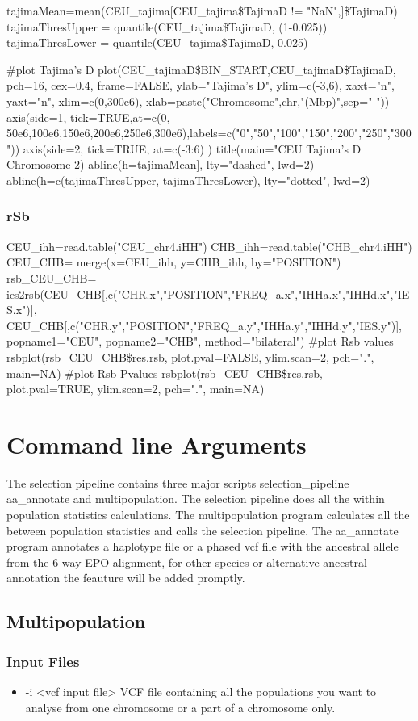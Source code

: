 \documentclass[a4paper,10pt]{article}
\begin{document}
tajimaMean=mean(CEU\_tajima[CEU\_tajima\$TajimaD != "NaN",]\$TajimaD)
tajimaThresUpper = quantile(CEU\_tajima\$TajimaD, (1-0.025))
tajimaThresLower = quantile(CEU\_tajima\$TajimaD, 0.025)

#plot Tajima's D
plot(CEU\_tajimaD\$BIN\_START,CEU\_tajimaD\$TajimaD, pch=16, cex=0.4,
       frame=FALSE, ylab="Tajima's D", ylim=c(-3,6), xaxt="n", yaxt="n",
       xlim=c(0,300e6), xlab=paste("Chromosome",chr,"(Mbp)",sep=" "))
axis(side=1, tick=TRUE,at=c(0, 50e6,100e6,150e6,200e6,250e6,300e6),labels=c("0","50","100","150","200","250","300"))
axis(side=2, tick=TRUE, at=c(-3:6) ) 
title(main="CEU Tajima's D Chromosome 2)
abline(h=tajimaMean], lty="dashed", lwd=2)
abline(h=c(tajimaThresUpper, tajimaThresLower), lty="dotted", lwd=2)




\subsubsection{rSb}
CEU\_ihh=read.table("CEU\_chr4.iHH")
CHB\_ihh=read.table("CHB\_chr4.iHH")
CEU\_CHB= merge(x=CEU\_ihh, y=CHB\_ihh, by="POSITION")
rsb\_CEU\_CHB= ies2rsb(CEU\_CHB[,c("CHR.x","POSITION","FREQ\_a.x","IHHa.x","IHHd.x","IES.x")], CEU\_CHB[,c("CHR.y","POSITION","FREQ\_a.y","IHHa.y","IHHd.y","IES.y")], 
                     popname1="CEU", popname2="CHB", method="bilateral")
#plot Rsb values
rsbplot(rsb\_CEU\_CHB\$res.rsb, plot.pval=FALSE, ylim.scan=2, pch=".", main=NA)
#plot Rsb Pvalues
rsbplot(rsb\_CEU\_CHB\$res.rsb, plot.pval=TRUE, ylim.scan=2, pch=".", main=NA)

\section{Command line Arguments}
The selection pipeline contains three major scripts selection\_pipeline aa\_annotate and multipopulation. The selection pipeline does all the within population statistics calculations. The multipopulation program calculates all the between population statistics and calls the selection pipeline. The aa\_annotate program annotates a haplotype file or a phased vcf file with the ancestral allele from the 6-way EPO alignment, for other species or alternative ancestral annotation the feauture will be added promptly.
\subsection{Multipopulation}
\subsubsection{Input Files}
\begin{itemize}
\item -i <vcf input file>
VCF file containing all the populations you want to analyse from one chromosome or a part of a chromosome only. 
\end{itemize}
\end{document}
